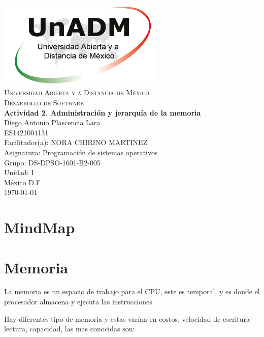 \documentclass[spanish,12pt,letterpapper]{article}
\begin{document}
	\begin{titlepage}
		\begin{center}
			\includegraphics[width=0.6\textwidth]{../logoUnADM}~\\[1cm] 
			\textsc{Universidad Abierta y a Distancia de México}\\[0.8cm]
			\textsc{Desarrollo de Software}\\[1.8cm]
			
			\textbf{ \Large Actividad 2. Administración y jerarquía de la memoria}\\[3cm]
			
			Diego Antonio Plascencia Lara\\ ES1421004131 \\[0.4cm]
			Facilitador(a): NORA CHIRINO MARTINEZ\\
			Asignatura: Programación de sistemas operativos\\
			Grupo: DS-DPSO-1601-B2-005 \\
			Unidad: I \\
			
			\vfill México D.F\\{\today}
			
		\end{center}
	\end{titlepage}
	
	\section{MindMap}
	\section{Memoria}
	La memoria es un espacio de trabajo para el CPU, este es temporal, y es donde el procesador almacena y ejecuta las instrucciones.
	
	Hay diferentes tipo de memoria y estas varían en costos, velocidad de escritura-lectura, capacidad, las mas conocidas son:
	
\end{document}
